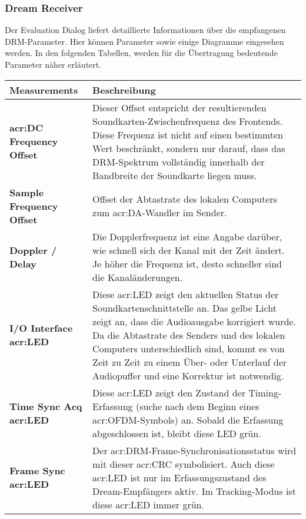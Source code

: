 \subsubsection{Dream Receiver}
\label{subsec:Unterabschnitt12}

Der Evaluation Dialog liefert detaillierte Informationen über die empfangenen DRM-Parameter. Hier können Parameter sowie einige Diagramme eingesehen werden. In den folgenden Tabellen, werden für die Übertragung bedeutende Parameter näher erläutert.

\begin{table}[h]
	\begin{center}
		\begin{tabular}{|p{0.28\linewidth} | p{0.72\linewidth}|}	
			\toprule
			\textbf{Measurements} & \textbf{Beschreibung} \\
			\midrule
			\textbf{\gls{acr:DC} Frequency Offset} & Dieser Offset entspricht der resultierenden Soundkarten-Zwischenfrequenz des Frontends. Diese Frequenz ist nicht auf einen bestimmten Wert beschränkt, sondern nur darauf, dass das DRM-Spektrum vollständig innerhalb der Bandbreite der Soundkarte liegen muss.\\
			\midrule
			\textbf{Sample Frequency Offset} & Offset der Abtastrate des lokalen Computers zum \gls{acr:DA}-Wandler im Sender. \\
			\midrule
			\textbf{Doppler / Delay} & Die Dopplerfrequenz ist eine Angabe darüber, wie schnell sich der Kanal mit der Zeit ändert. Je höher die Frequenz ist, desto schneller sind die Kanaländerungen. \\
			\midrule
			\textbf{I/O Interface \gls{acr:LED}} & Diese \gls{acr:LED} zeigt den aktuellen Status der Soundkartenschnittstelle an. Das gelbe Licht zeigt an, dass die Audioausgabe korrigiert wurde. Da die Abtastrate des Senders und des lokalen Computers unterschiedlich sind, kommt es von Zeit zu Zeit zu einem Über- oder Unterlauf der Audiopuffer und eine Korrektur ist notwendig.\\
			\midrule
			\textbf{Time Sync Acq \gls{acr:LED}} &Diese \gls{acr:LED} zeigt den Zustand der Timing-Erfassung (suche nach dem Beginn eines \gls{acr:OFDM}-Symbols) an. Sobald die Erfassung abgeschlossen ist, bleibt diese LED grün.	\\
			\midrule
			\textbf{Frame Sync \gls{acr:LED}} & Der \gls{acr:DRM}-Frame-Synchronisationsstatus wird mit dieser \gls{acr:CRC} symbolisiert. Auch diese \gls{acr:LED} ist nur im Erfassungszustand des Dream-Empfängers aktiv. Im Tracking-Modus ist diese \gls{acr:LED} immer grün.\\

\end{tabular}
\end{center}
\end{table}
